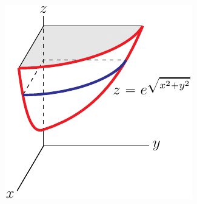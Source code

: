 \begin{eg}
\begin{nfig}
\begin{center}
    \includegraphics{revB.pdf}
\end{center}
\end{nfig}



\end{eg}

